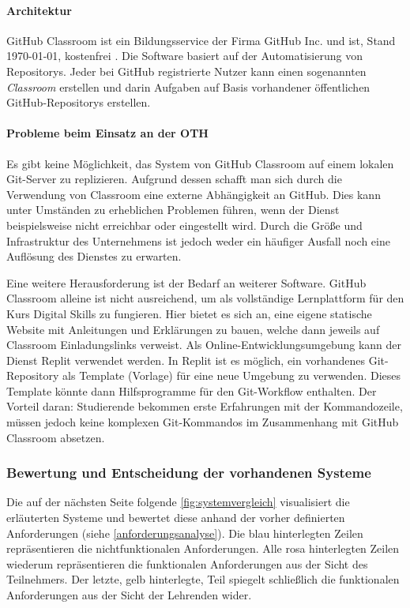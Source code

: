 \paragraph{Architektur}
GitHub Classroom ist ein Bildungsservice der Firma GitHub Inc. und ist, Stand
\today, kostenfrei \parencite{github-classroom-kostenlos}. Die Software basiert
auf der Automatisierung von Repositorys. Jeder bei GitHub registrierte Nutzer
kann einen sogenannten \emph{Classroom} erstellen und darin Aufgaben auf
Basis vorhandener öffentlichen GitHub-Repositorys erstellen.

\paragraph{Probleme beim Einsatz an der OTH}
Es gibt keine Möglichkeit, das System von GitHub Classroom auf einem lokalen
Git-Server zu replizieren. Aufgrund dessen schafft man sich durch die
Verwendung von Classroom eine externe Abhängigkeit an GitHub. Dies kann unter
Umständen zu erheblichen Problemen führen, wenn der Dienst beispielsweise
nicht erreichbar oder eingestellt wird. Durch die Größe und Infrastruktur des
Unternehmens ist jedoch weder ein häufiger Ausfall noch eine Auflösung des
Dienstes zu erwarten.

Eine weitere Herausforderung ist der Bedarf an weiterer Software. GitHub
Classroom alleine ist nicht ausreichend, um als vollständige Lernplattform für
den Kurs Digital Skills zu fungieren. Hier bietet es sich an, eine eigene
statische Website mit Anleitungen und Erklärungen zu bauen, welche dann jeweils
auf Classroom Einladungslinks verweist. Als Online-Entwicklungsumgebung kann der
Dienst Replit verwendet werden. In Replit ist es möglich, ein vorhandenes
Git-Repository als Template (Vorlage) für eine neue Umgebung zu verwenden.
Dieses Template könnte dann Hilfsprogramme für den Git-Workflow enthalten. Der
Vorteil daran: Studierende bekommen erste Erfahrungen mit der Kommandozeile,
müssen jedoch keine komplexen Git-Kommandos im Zusammenhang mit GitHub Classroom
absetzen.

\subsubsection{Bewertung und Entscheidung der vorhandenen Systeme}
Die auf der nächsten Seite folgende \autoref{fig:systemvergleich} visualisiert
die erläuterten Systeme und bewertet diese anhand der vorher definierten
Anforderungen (siehe \autoref{anforderungsanalyse}). Die blau hinterlegten
Zeilen repräsentieren die nichtfunktionalen Anforderungen. Alle rosa
hinterlegten Zeilen wiederum repräsentieren die funktionalen Anforderungen aus
der Sicht des Teilnehmers. Der letzte, gelb hinterlegte, Teil spiegelt
schließlich die funktionalen Anforderungen aus der Sicht der Lehrenden wider.

